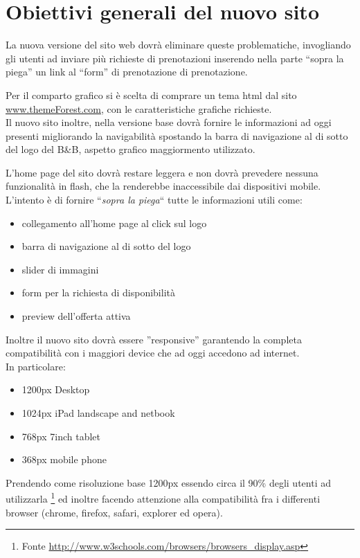 \documentclass[a4paper,12pt,hidelinks]{report}
\begin{document}
\section{Obiettivi generali del nuovo sito}
  La nuova versione del sito web dovrà eliminare queste problematiche, invogliando gli utenti ad inviare più richieste di prenotazioni inserendo nella parte ``sopra la piega'' 
  un link al ``form'' di prenotazione di prenotazione.
  \par Per il comparto grafico si è scelta di comprare un tema html dal sito \url{www.themeForest.com}, con le caratteristiche grafiche richieste.
  \\ Il nuovo sito inoltre, nella versione base dovrà fornire le informazioni ad oggi presenti migliorando la navigabilità spostando la barra di navigazione al di sotto del logo del B\&B, 
  aspetto grafico maggiormento utilizzato.
  \par L'home page del sito dovrà restare leggera e non dovrà prevedere nessuna funzionalità in flash, che la renderebbe inaccessibile dai dispositivi mobile.
  L'intento è di fornire ``\textit{sopra la piega}`` tutte le informazioni utili come:
  \begin{itemize}
    \item collegamento all'home page al click sul logo
    \item barra di navigazione al di sotto del logo
    \item slider di immagini
    \item form per la richiesta di disponibilità
    \item preview dell'offerta attiva
  \end{itemize}
  \par Inoltre il nuovo sito dovrà essere ''responsive'' garantendo la completa compatibilità con i maggiori device che ad oggi accedono ad internet.
  \\In particolare:
  \begin{itemize}
    \item 1200px Desktop
    \item 1024px iPad landscape and netbook
    \item 768px 7inch tablet
    \item 368px mobile phone
  \end{itemize}
  Prendendo come risoluzione base 1200px essendo circa il 90\% degli utenti ad utilizzarla \footnote{Fonte \url{http://www.w3schools.com/browsers/browsers_display.asp}}
  ed inoltre facendo attenzione alla compatibilità fra i differenti browser (chrome, firefox, safari, explorer ed opera).
\end{document}
